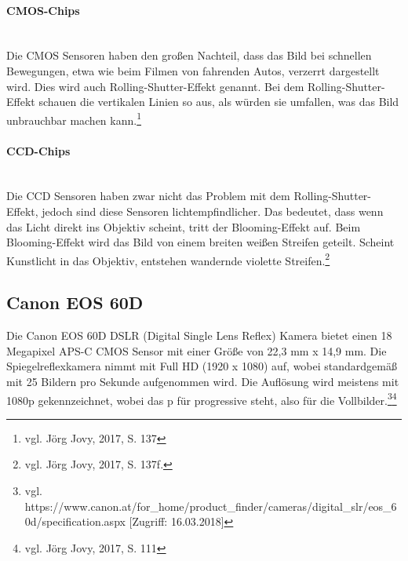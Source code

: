 \paragraph{CMOS-Chips}
\leavevmode \\
Die CMOS Sensoren haben den großen Nachteil, dass das Bild bei schnellen Bewegungen, etwa wie beim Filmen von fahrenden Autos, verzerrt dargestellt wird. Dies wird auch Rolling-Shutter-Effekt genannt. Bei dem Rolling-Shutter-Effekt schauen die vertikalen Linien so aus, als würden sie umfallen, was das Bild unbrauchbar machen kann.\footnote{\label{}vgl. Jörg Jovy, 2017, S. 137}
\paragraph{CCD-Chips}
\leavevmode \\
Die CCD Sensoren haben zwar nicht das Problem mit dem Rolling-Shutter-Effekt, jedoch sind diese Sensoren lichtempfindlicher. Das bedeutet, dass wenn das Licht direkt ins Objektiv scheint, tritt der Blooming-Effekt auf. Beim Blooming-Effekt wird das Bild von einem breiten weißen Streifen geteilt. Scheint Kunstlicht in das Objektiv, entstehen wandernde violette Streifen.\footnote{\label{}vgl. Jörg Jovy, 2017, S. 137f.}
\subsection{Canon EOS 60D}
Die Canon EOS 60D DSLR (Digital Single Lens Reflex) Kamera bietet einen 18 Megapixel APS-C CMOS Sensor mit einer Größe von 22,3 mm x 14,9 mm. Die Spiegelreflexkamera nimmt mit Full HD (1920 x 1080) auf, wobei standardgemäß mit 25 Bildern pro Sekunde aufgenommen wird. Die Auflösung wird meistens mit 1080p gekennzeichnet, wobei das p für progressive steht, also für die Vollbilder.\footnote{\label{}vgl. https://www.canon.at/for\_home/product\_finder/cameras/digital\_slr/eos\_60d/specification.aspx [Zugriff: 16.03.2018]}\footnote{\label{}vgl. Jörg Jovy, 2017, S. 111}
